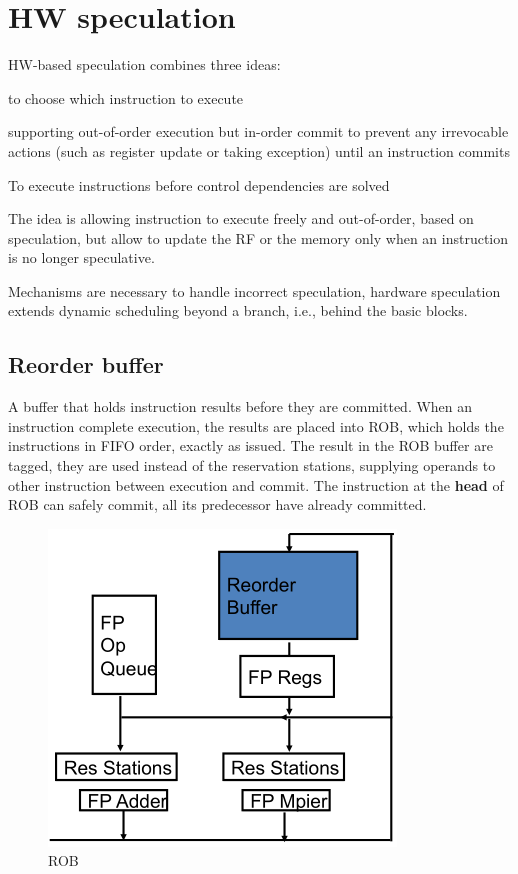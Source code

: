 
\section{HW speculation}\label{sec:hw-speculation}
HW-based speculation combines three ideas:
\begin{description}[noitemsep]
    \item[Dynamic Branch Prediction] to choose which instruction to execute
    \item[Dynamic Scheduling] supporting out-of-order execution but in-order commit to prevent any irrevocable
    actions (such as register update or taking exception) until an instruction commits
    \item[Speculation] To execute instructions before control dependencies are solved
\end{description}
The idea is allowing instruction to execute freely and out-of-order, based on speculation, but allow to update the RF
or the memory only when an instruction is no longer speculative.

Mechanisms are necessary to handle incorrect speculation, hardware speculation extends dynamic scheduling beyond a
branch, i.e., behind the basic blocks.

\subsection{Reorder buffer}\label{subsec:reorder-buffer}
A buffer that holds instruction results before they are committed.
When an instruction complete execution, the results are placed into ROB, which holds the instructions in FIFO order,
exactly as issued.
The result in the ROB buffer are tagged, they are used instead of the reservation stations, supplying operands to
other instruction between execution and commit.
The instruction at the \textbf{head} of ROB can safely commit, all its predecessor have already committed.

\begin{figure}[h]
    \centering
    \includegraphics[scale = 0.4]{images/reorder-buffer}
    \caption{ROB}
    \label{fig:rob}
\end{figure}

